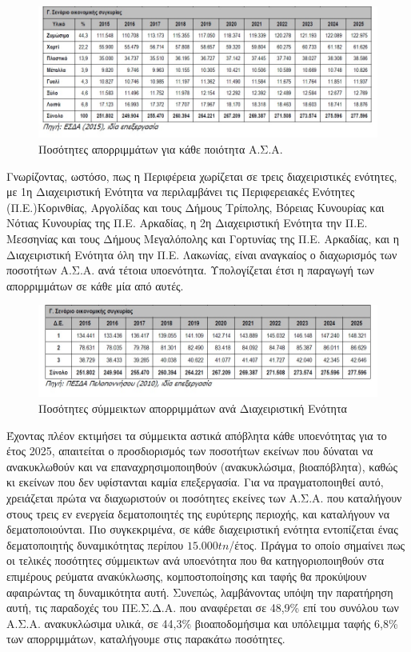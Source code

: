 \documentclass[12pt]{article}
\begin{document}
	\begin{figure} [H]
		\begin{center}
			\includegraphics [scale = 0.80] {table14.png}
			\caption{Ποσότητες απορριμμάτων για κάθε ποιότητα Α.Σ.Α.}
		\end{center}
	\end{figure}

	Γνωρίζοντας, ωστόσο,  πως η Περιφέρεια χωρίζεται σε τρεις διαχειριστικές ενότητες, με 1η Διαχειριστική Ενότητα να περιλαμβάνει τις Περιφερειακές Ενότητες (Π.Ε.)Κορινθίας, Αργολίδας και τους Δήμους Τρίπολης, Βόρειας Κυνουρίας και Νότιας Κυνουρίας της Π.Ε. Αρκαδίας, η 2η Διαχειριστική Ενότητα την Π.Ε. Μεσσηνίας και τους Δήμους Μεγαλόπολης και Γορτυνίας της Π.Ε. Αρκαδίας, και η Διαχειριστική Ενότητα όλη την Π.Ε. Λακωνίας, είναι αναγκαίος ο διαχωρισμός των ποσοτήτων Α.Σ.Α. ανά τέτοια υποενότητα. Υπολογίζεται έτσι η παραγωγή των απορριμμάτων σε κάθε μία από αυτές.
	
	\begin{figure} [H]
		\begin{center}
			\includegraphics [scale = 0.80] {table15.png}
			\caption{Ποσότητες σύμμεικτων απορριμμάτων ανά Διαχειριστική Ενότητα}
		\end{center}
	\end{figure}
	
	Έχοντας πλέον εκτιμήσει τα σύμμεικτα αστικά απόβλητα κάθε υποενότητας για το έτος 2025, απαιτείται ο προσδιορισμός των ποσοτήτων εκείνων που δύναται να ανακυκλωθούν και να επαναχρησιμοποιηθούν (ανακυκλώσιμα, βιοαπόβλητα), καθώς κι εκείνων που δεν υφίστανται καμία επεξεργασία. Για να πραγματοποιηθεί αυτό, χρειάζεται πρώτα να διαχωριστούν οι ποσότητες εκείνες των Α.Σ.Α. που καταλήγουν στους τρεις εν ενεργεία δεματοποιητές της ευρύτερης περιοχής, και καταλήγουν να δεματοποιούνται. Πιο συγκεκριμένα, σε κάθε διαχειριστική ενότητα εντοπίζεται ένας δεματοποιητής δυναμικότητας περίπου $15.000 tn$/έτος. Πράγμα το οποίο σημαίνει πως οι τελικές ποσότητες  σύμμεικτων ανά υποενότητα που θα κατηγοριοποιηθούν στα επιμέρους ρεύματα ανακύκλωσης, κομποστοποίησης και ταφής θα προκύψουν αφαιρώντας τη δυναμικότητα αυτή. Συνεπώς, λαμβάνοντας υπόψη την παρατήρηση αυτή, τις παραδοχές του ΠΕ.Σ.Δ.Α. που αναφέρεται σε 48,9\% επί του συνόλου των Α.Σ.Α. ανακυκλώσιμα υλικά, σε 44,3\% βιοαποδομήσιμα και υπόλειμμα ταφής  6,8\% των απορριμμάτων, καταλήγουμε στις παρακάτω ποσότητες.
	
\end{document}
